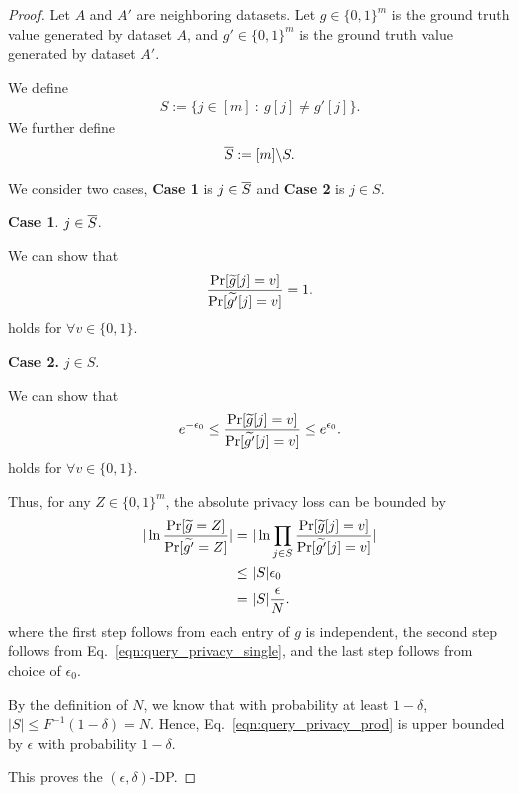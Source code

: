 \begin{proof}
Let $A$ and $A'$ are neighboring datasets. Let $g \in \{0, 1\}^m$ is the ground truth value generated by dataset $A$, and $g' \in \{0, 1\}^m$ is the ground truth value generated by dataset $A'$. 


We define
\begin{align*}
    S := \{j \in [m] ~:~ g[j] \neq g'[j]\}.
\end{align*}
We further define
\begin{align*}
    \overline{S} := [m] \backslash S.
\end{align*}

We consider two cases, {\bf Case 1} is $j \in \overline{S}$ and {\bf Case 2} is $j \in S$.

{\bf Case 1}. $j \in \overline{S}$. 

We can show that
\begin{align*}
\frac{ \Pr [ \widetilde{g}[j] = v ] }{\Pr[ \widetilde{g'}[j] = v ] } = 1.
\end{align*}
holds for $\forall v \in \{0, 1\}$.

{\bf Case 2.} $j \in S$.

We can show that
\begin{align}\label{eqn:query_privacy_single}
    e^{-\epsilon_0}\leq \frac{ \Pr[ \widetilde{g}[j] = v ] }{ \Pr[ \widetilde{g'}[j] = v] } \leq e^{\epsilon_0}.
\end{align}
holds for $\forall v \in \{0, 1\}$. 

Thus, for any $Z\in \{0,1\}^m$, the absolute privacy loss can be bounded by
\begin{align}\label{eqn:query_privacy_prod}
     |\ln \frac{ \Pr[ \widetilde{g} = Z ] }{ \Pr[ \widetilde{g'} = Z ] } | 
     = & ~  |\ln \prod_{j\in S} \frac{ \Pr[ \widetilde{g}[j] = v ] }{ \Pr[ \widetilde{g'}[j] = v ] }  | \notag \\
     \leq & ~ |S| \epsilon_0 \notag \\
     = & ~  |S|\frac{\epsilon}{N}.  
\end{align}
where the first step follows from each entry of $g$ is independent, the second step follows from Eq.~\eqref{eqn:query_privacy_single}, and the last step follows from choice of $\epsilon_0$.

By the definition of $N$, we know that with probability at least $1-\delta$, $|S|\leq F^{-1}(1-\delta)=N$. Hence, Eq.~\eqref{eqn:query_privacy_prod} is upper bounded by $\epsilon$ with probability $1-\delta$. 

This proves the $(\epsilon,\delta)$-DP.
\end{proof}